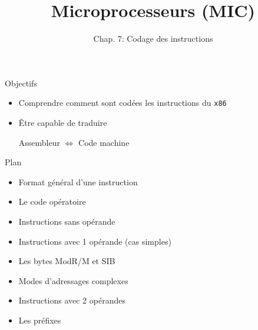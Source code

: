 \documentclass[14pt,xcolor,table]{beamer}
\title{Microprocesseurs (MIC)}
\subtitle{Chap. 7: Codage des instructions}
\date{}
\begin{document}
\begin{frame}
	\titlepage
\end{frame}

\begin{frame}[fragile]{Objectifs}
	
	\begin{itemize}
	\item 
		Comprendre comment sont codées les instructions du \verb_x86_
		\bigskip
	\item 
		Être capable de traduire 
		\begin{center}
			Assembleur $\Longleftrightarrow$ Code machine
		\end{center}
	\end{itemize}
	
\end{frame}

\begin{frame}[fragile]{Plan}

	\begin{itemize}
	\item Format général d'une instruction
	\item Le code opératoire
	\item Instructions sans opérande
	\item Instructions avec 1 opérande (cas simples)
	\item Les bytes ModR/M et SIB
	\item Modes d'adressages complexes
	\item Instructions avec 2 opérandes
	\item Les préfixes
	\end{itemize}

\end{frame}
\end{document}
